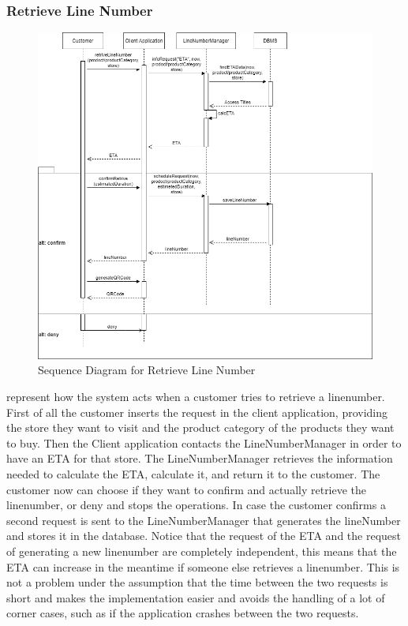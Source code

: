 \subsubsection{Retrieve Line Number}
\begin{figure}[H]
    \centering
    \includegraphics[height=0.4\textwidth]{Images/CustomerSequenceDiagrams/RetriveLineNumberSequenceDiagram.png}
    \caption{Sequence Diagram for Retrieve Line Number}
    \label{fig:SDRetrieveLineNumber}
\end{figure}
 represent how the system acts when a customer tries to retrieve a linenumber.
First of all the customer inserts the request in the client application, providing the store they want to visit and the product category of the products they want to buy.
Then the Client application contacts the LineNumberManager in order to have an ETA for that store.
The LineNumberManager retrieves the information needed to calculate the ETA, calculate it, and return it to the customer.
The customer now can choose if they want to confirm and actually retrieve the linenumber, or deny and stops the operations.
In case the customer confirms a second request is sent to the LineNumberManager that generates the lineNumber and stores it in the database.
Notice that the request of the ETA and the request of generating a new linenumber are completely independent, this means that the ETA can increase in the meantime if someone else retrieves a linenumber.
This is not a problem under the assumption that the time between the two requests is short and makes the implementation easier and avoids the handling of a lot of corner cases, such as if the application crashes between the two requests.

